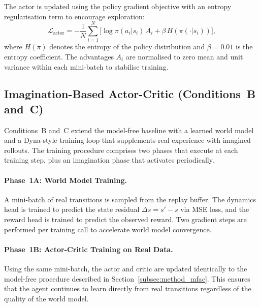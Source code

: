 The actor is updated using the policy gradient objective with an entropy
regularisation term to encourage exploration:
\begin{equation}
    \label{eq:actor_loss}
    \mathcal{L}_{\text{actor}} = -\frac{1}{N} \sum_{i=1}^{N}
    \bigl[ \log \pi(a_i | s_i)\, A_i + \beta\, H(\pi(\cdot | s_i)) \bigr],
\end{equation}
where $H(\pi)$ denotes the entropy of the policy distribution and $\beta = 0.01$
is the entropy coefficient. The advantages $A_i$ are normalised to zero mean and
unit variance within each mini-batch to stabilise training.

\subsection{Imagination-Based Actor-Critic (Conditions~B and~C)}
\label{subsec:method_imag}

Conditions~B and~C extend the model-free baseline with a learned world model and
a Dyna-style training loop that supplements real experience
with imagined rollouts. The training procedure comprises two phases that execute at
each training step, plus an imagination phase that activates periodically.

\paragraph{Phase~1A: World Model Training.}
A mini-batch of real transitions is sampled from the replay buffer. The dynamics
head is trained to predict the state residual $\Delta s = s' - s$ via MSE loss,
and the reward head is trained to predict the observed reward. Two gradient steps
are performed per training call to accelerate world model convergence.

\paragraph{Phase~1B: Actor-Critic Training on Real Data.}
Using the same mini-batch, the actor and critic are updated identically to the
model-free procedure described in Section~\ref{subsec:method_mfac}. This ensures
that the agent continues to learn directly from real transitions regardless of the
quality of the world model.

